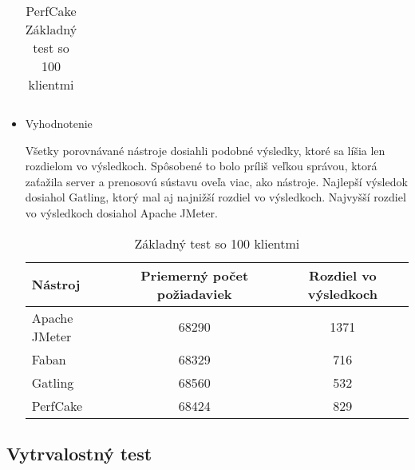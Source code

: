 \documentclass[12pt,oneside,final]{fithesis-utf8}
\begin{document}
\begin{itemize}
\begin{table}[H]
\begin{center}
\begin{tabular}{ | l | c | c | c | c |}
\end{tabular}
\end{center}
\caption{PerfCake Základný test so 100 klientmi}
\end{table}

\item Vyhodnotenie

Všetky porovnávané nástroje dosiahli podobné výsledky, ktoré sa líšia len rozdielom vo výsledkoch. Spôsobené to bolo príliš veľkou správou, ktorá zaťažila server a prenosovú sústavu oveľa viac, ako nástroje. Najlepší výsledok dosiahol Gatling, ktorý mal aj najnižší rozdiel vo výsledkoch. Najvyšší rozdiel vo výsledkoch dosiahol Apache JMeter.

\begin{table}[H]
\begin{center}
\begin{tabular}{ | l | c | c |}
		\hline
		 \textbf{Nástroj} & \textbf{Priemerný počet požiadaviek} & \textbf{Rozdiel vo výsledkoch} \\ \hline
		 Apache JMeter & 68290 & 1371 \\ \hline
		 Faban & 68329 & 716 \\ \hline
		 Gatling & 68560 & 532 \\ \hline
		 PerfCake & 68424 & 829 \\ \hline
\end{tabular}
\end{center}
\caption{Základný test so 100 klientmi}
\end{table}

\end{itemize}

\subsection{Vytrvalostný test}
\end{document}
